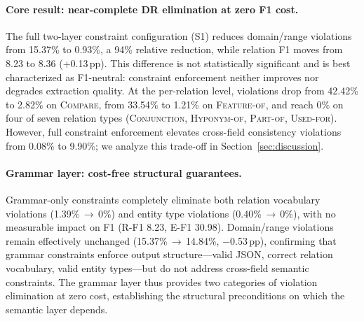 \paragraph{Core result: near-complete DR elimination at zero F1 cost.}
The full two-layer constraint configuration (S1) reduces domain/range
violations from 15.37\% to 0.93\%, a 94\% relative reduction,
while relation F1 moves from 8.23 to 8.36 (+0.13\,pp).
This difference is not statistically significant and is best
characterized as F1-neutral: constraint enforcement neither improves
nor degrades extraction quality.
At the per-relation level, violations drop from 42.42\% to 2.82\% on
\textsc{Compare}, from 33.54\% to 1.21\% on \textsc{Feature-of}, and
reach 0\% on four of seven relation types
(\textsc{Conjunction}, \textsc{Hyponym-of}, \textsc{Part-of},
\textsc{Used-for}).
However, full constraint enforcement elevates cross-field consistency
violations from 0.08\% to 9.90\%;
we analyze this trade-off in Section~\ref{sec:discussion}.

\paragraph{Grammar layer: cost-free structural guarantees.}
Grammar-only constraints completely eliminate both relation vocabulary
violations (1.39\%\,$\to$\,0\%) and entity type violations
(0.40\%\,$\to$\,0\%), with no measurable impact on F1
(R-F1 8.23, E-F1 30.98).
Domain/range violations remain effectively unchanged
(15.37\%\,$\to$\,14.84\%, $-$0.53\,pp), confirming that grammar
constraints enforce output structure---valid JSON, correct relation
vocabulary, valid entity types---but do not address cross-field
semantic constraints.
The grammar layer thus provides two categories of violation elimination
at zero cost, establishing the structural preconditions on which the
semantic layer depends.

